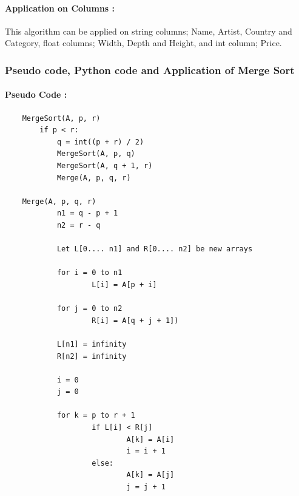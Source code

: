\documentclass[12pt]{article}
\begin{document}
    \paragraph{Application on Columns :} 
    This algorithm can be applied on string columns; Name, Artist, Country and Category, float columns; Width, Depth and Height, and int column; Price.
    
    \newpage
    \subsubsection{Pseudo code, Python code and Application of Merge Sort}
    \paragraph{Pseudo Code :}
    \begin{verbatim}
    MergeSort(A, p, r) 
        if p < r:
            q = int((p + r) / 2)
            MergeSort(A, p, q)
            MergeSort(A, q + 1, r)
            Merge(A, p, q, r)

    Merge(A, p, q, r)
            n1 = q - p + 1
            n2 = r - q
    
            Let L[0.... n1] and R[0.... n2] be new arrays 
            
            for i = 0 to n1
                    L[i] = A[p + i]
    
            for j = 0 to n2
                    R[i] = A[q + j + 1])
    
            L[n1] = infinity
            R[n2] = infinity
            
            i = 0
            j = 0
            
            for k = p to r + 1
                    if L[i] < R[j]
                            A[k] = A[i]
                            i = i + 1
                    else:
                            A[k] = A[j]
                            j = j + 1     
    \end{verbatim}
\end{document}
